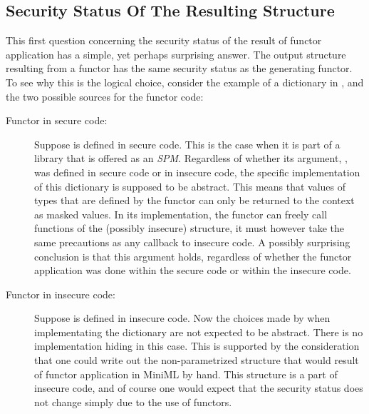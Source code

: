 \documentclass[10pt,a4paper,master=cws, masteroption=ai,english,inputenc=utf8]{kulemt}
\begin{document}
\subsection{Security Status Of The Resulting Structure\label{sec:SecurityStatus}}
This first question concerning the security status of the result of functor application has a simple, yet perhaps surprising answer.
The output structure resulting from a functor has the same security status as the generating functor.
To see why this is the logical choice, consider the example of a dictionary in , and the two possible sources for the functor code:
\begin{description}
\item[Functor in secure code:] 
Suppose  is defined in secure code.
This is the case when it is part of a library that is offered as an \emph{SPM}.
Regardless of whether its argument, , was defined in secure code or in insecure code, the specific implementation of this dictionary is supposed to be abstract.
This means that values of types that are defined by the functor can only be returned to the context as masked values.
In its implementation, the functor can freely call functions of the (possibly insecure) structure, it must however take the same precautions as any callback to insecure code.
A possibly surprising conclusion is that this argument holds, regardless of whether the functor application was done within the secure code or within the insecure code.
\item[Functor in insecure code:] Suppose  is defined in insecure code.
Now the choices made by when implementating the dictionary are not expected to be abstract. There is no implementation hiding in this case.
This is supported by the consideration that one could write out the non-parametrized structure that would result of functor application in MiniML by hand. 
This structure is a part of insecure code, and of course one would expect that the security status does not change simply due to the use of functors.
\end{description}
\end{document}
